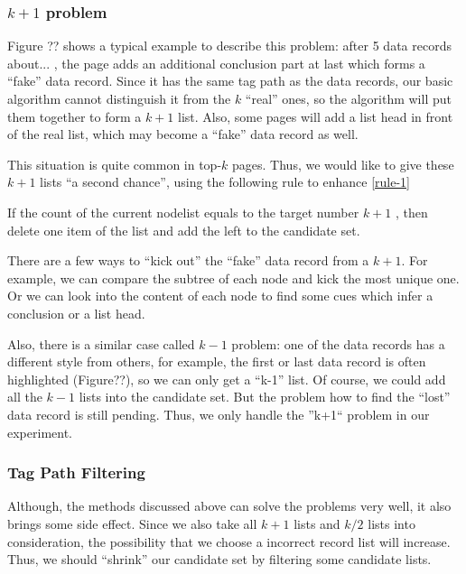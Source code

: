 \subsubsection*{$k+1$ problem}
Figure ?? shows a typical example to describe this problem:
after 5 data records about... , 
the page adds an additional conclusion part at last
which forms a ``fake'' data record.
Since it has the same tag path as the data records,
our basic algorithm cannot distinguish it from the $k$ ``real'' ones,
so the algorithm will put them together to form a $k+1$ list.
Also, some pages will add a list head in front of the real list, 
which may become a ``fake'' data record as well.

This situation is quite common in top-$k$ pages.
Thus, we would like to give these $k+1$ lists ``a second chance'',
using the following rule to enhance \ref{rule-1}

\begin{newrule}\label{rule-1-2}
If the count of the current nodelist equals to the target number $k+1$ , 
then delete one item of the list
and add the left to the candidate set.
\end{newrule}

There are a few ways to ``kick out'' the ``fake'' data record from a $k+1$.
For example, we can compare the subtree of each node and kick the most unique one.
Or we can look into the content of each node to find some cues 
which infer a conclusion or a list head.

Also, there is a similar case called $k-1$ problem:
one of the data records has a different style from others,
for example, the first or last data record is often highlighted (Figure??),
so we can only get a ``k-1'' list.
Of course, we could add all the $k-1$ lists into the candidate set.
But the problem how to find the ``lost'' data record is still pending.
Thus, we only handle the ''k+1`` problem in our experiment.

\subsubsection*{Tag Path Filtering}
Although, the methods discussed above can solve the problems very well,
it also brings some side effect.
Since we also take all $k+1$ lists and $k/2$ lists into consideration,
the possibility that we choose a incorrect record list will increase.
Thus, we should ``shrink'' our candidate set by filtering some candidate lists.

